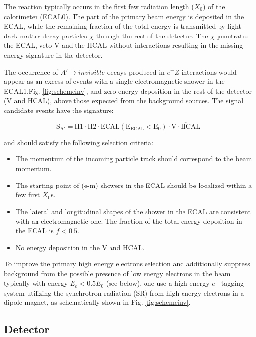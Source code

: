 The reaction typically occurs in the first few radiation length ($X_0$) of the calorimeter (ECAL0). The part of the primary beam
energy is deposited in the ECAL, while the remaining fraction of the total energy is transmitted by light dark matter
decay particles $\chi$ through the rest of the detector. The $\chi$ penetrates the ECAL, veto V and the HCAL without
interactions resulting in the missing-energy signature in the detector.\par

The occurrence of $A'\rightarrow invisible$ decays produced in $e^-Z$ interactions would appear as an excess of events
with a single electromagnetic shower in the ECAL1,Fig. \ref{fig:schemeinv}, and zero energy deposition in the rest of
the detector (V and HCAL), above those expected from the background sources. The signal candidate events have the
signature:\par



\begin{equation}
\mathrm{ S_{A'} = H1 \cdot H2\cdot ECAL (E_{ECAL}<E_0)\cdot \overline{V\cdot HCAL}}
\end{equation}

and should satisfy the following selection criteria:

\begin{itemize}
\item The momentum of the incoming particle track should correspond to the beam momentum.
\item The starting point of (e-m) showers in the ECAL should be localized within a few first $X_0$s.
\item The lateral and longitudinal shapes of the shower in the ECAL are consistent with an electromagnetic one. The
fraction of the total energy deposition in the ECAL is $f<0.5$.
\item No energy deposition in the V and HCAL.
\end{itemize}

To improve the primary high energy electrons selection and additionally suppress background from the possible presence
of low energy electrons in the beam typically with energy $E_e <0.5 E_0$ (see below), one use a high energy $e^-$ tagging
system utilizing the synchrotron radiation (SR) from high energy electrons in a dipole magnet, as schematically shown in
Fig. \ref{fig:schemeinv}. 




\subsection{Detector}

